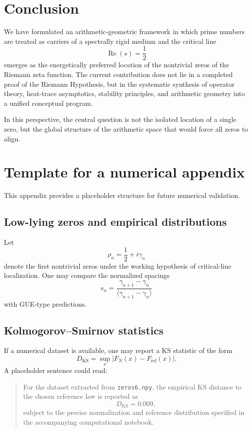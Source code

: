 \documentclass[11pt,a4paper]{amsart}
\theoremstyle{plain}
\theoremstyle{definition}
\theoremstyle{remark}
\newcommand{\RePart}{\operatorname{Re}}
\begin{document}
	\section{Conclusion}
	
	We have formulated an arithmetic-geometric framework in which prime numbers are treated as carriers of a spectrally rigid medium and the critical line
	\[
	\RePart(s)=\frac12
	\]
	emerges as the energetically preferred location of the nontrivial zeros of the Riemann zeta function. The current contribution does not lie in a completed proof of the Riemann Hypothesis, but in the systematic synthesis of operator theory, heat-trace asymptotics, stability principles, and arithmetic geometry into a unified conceptual program.
	
	In this perspective, the central question is not the isolated location of a single zero, but the global structure of the arithmetic space that would force all zeros to align.
	
	\appendix
	
	\section{Template for a numerical appendix}
	
	This appendix provides a placeholder structure for future numerical validation.
	
	\subsection{Low-lying zeros and empirical distributions}
	
	Let
	\[
	\rho_n=\frac12+i\gamma_n
	\]
	denote the first nontrivial zeros under the working hypothesis of critical-line localization. One may compare the normalized spacings
	\[
	s_n=\frac{\gamma_{n+1}-\gamma_n}{\langle \gamma_{n+1}-\gamma_n\rangle}
	\]
	with GUE-type predictions.
	
	\subsection{Kolmogorov--Smirnov statistics}
	
	If a numerical dataset is available, one may report a KS statistic of the form
	\[
	D_{\mathrm{KS}}=\sup_x |F_N(x)-F_{\mathrm{ref}}(x)|.
	\]
	A placeholder sentence could read:
	\begin{quote}
		For the dataset extracted from \texttt{zeros6.npy}, the empirical KS distance to the chosen reference law is reported as
		\[
		D_{\mathrm{KS}} = 0.009,
		\]
		subject to the precise normalization and reference distribution specified in the accompanying computational notebook.
	\end{quote}
	
\end{document}
